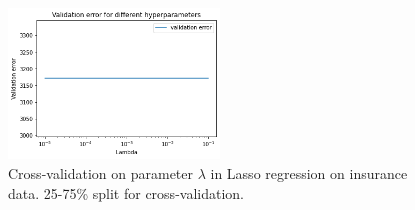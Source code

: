 \documentclass[10pt]{article}
\begin{document}
\begin{figure}[!ht]
  \centering
  \includegraphics[width=0.5\textwidth]{doc/images/cross_val_insurance.png}
  \caption{Cross-validation on parameter $\lambda$ in Lasso regression on insurance data. 25-75\% split for cross-validation.}
  \vspace{-3mm}
  \label{fig:cross-val-insurance}
\end{figure}
\end{document}
